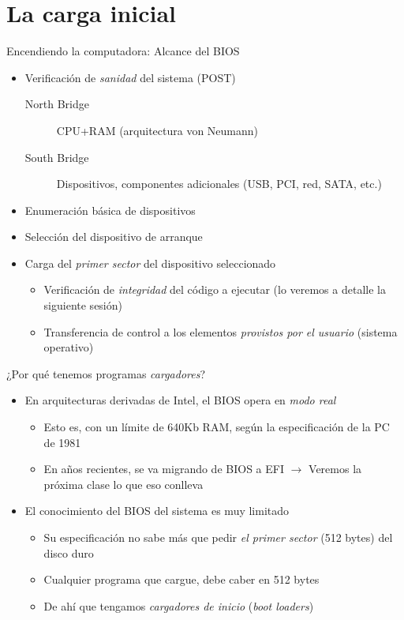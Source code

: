 \documentclass[presentation]{beamer}
\begin{document}
\section{La carga inicial}
\label{sec:org20d2de9}
\begin{frame}[label={sec:orge212ef7}]{Encendiendo la computadora: Alcance del BIOS}
\begin{itemize}
\item Verificación de \emph{sanidad} del sistema (POST)
\begin{description}
\item[{North Bridge}] CPU+RAM (arquitectura von Neumann)
\item[{South Bridge}] Dispositivos, componentes adicionales (USB, PCI,
red, SATA, etc.)
\end{description}
\item Enumeración básica de dispositivos
\item Selección del dispositivo de arranque
\item Carga del \emph{primer sector} del dispositivo seleccionado
\begin{itemize}
\item Verificación de \emph{integridad} del código a ejecutar (lo veremos a
detalle la siguiente sesión)
\item Transferencia de control a los elementos \emph{provistos por el
usuario} (sistema operativo)
\end{itemize}
\end{itemize}
\end{frame}

\begin{frame}[label={sec:org63782ee}]{¿Por qué tenemos programas \emph{cargadores}?}
\begin{itemize}
\item En arquitecturas derivadas de Intel, el BIOS opera en \emph{modo real}
\begin{itemize}
\item Esto es, con un límite de 640Kb RAM, según la especificación de
la PC de 1981
\item En años recientes, se va migrando de BIOS a EFI \(\rightarrow\)
Veremos la próxima clase lo que eso conlleva
\end{itemize}
\item El conocimiento del BIOS del sistema es muy limitado
\begin{itemize}
\item Su especificación no sabe más que pedir \emph{el primer sector} (512
bytes) del disco duro
\item Cualquier programa que cargue, debe caber en 512 bytes
\item De ahí que tengamos \emph{cargadores de inicio} (\emph{boot loaders})
\end{itemize}
\end{itemize}
\end{frame}
\end{document}
